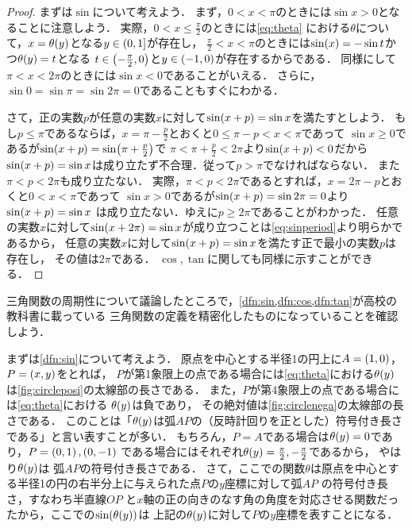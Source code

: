 \documentclass[11pt,a4paper]{ltjsarticle}
\newcommand*{\coord}[1]{\paren{#1}}
\theoremstyle{definition}
\begin{document}
\begin{proof}
  まずは$\sin$について考えよう．
  まず，$0 < x < \pi$のときには$\sin x > 0$となることに注意しよう．
  実際，$0 < x \leq \frac{\pi}{2}$のときには\cref{eq:theta}
  における$\theta$について，$x = \apply{\theta}{y}$となる$y \in \interval{lop}{0,1}$が存在し，
  $\frac{\pi}{2} < x < \pi$のときには$\apply{\sin}{x} = - \sin t$かつ$\apply{\theta}{y} = t$となる
  $t \in \interval{op}{- \frac{\pi}{2}, 0}$と$y \in \interval{op}{-1, 0}$が存在するからである．
  同様にして$\pi < x < 2 \pi$のときには$\sin x < 0$であることがいえる．
  さらに，$\sin 0 = \sin \pi = \sin 2 \pi = 0$であることもすぐにわかる．

  さて，正の実数$p$が任意の実数$x$に対して$\apply{\sin}{x + p} = \sin x$を満たすとしよう．
  もし$p \leq \pi$であるならば，$x = \pi - \frac{p}{2}$とおくと$0 \leq \pi - p < x < \pi$であって
  $\sin x \geq 0$であるが$\apply{\sin}{x + p} = \apply{\sin}{\pi + \frac{p}{2}}$で
  $\pi < \pi + \frac{p}{2} < 2 \pi$より$\apply{\sin}{x + p} < 0$だから
  $\apply{\sin}{x + p} = \sin x$は成り立たず不合理．従って$p > \pi$でなければならない．
  また$\pi < p < 2 \pi$も成り立たない．
  実際，$\pi < p < 2 \pi$であるとすれば，$x = 2 \pi - p$とおくと$0 < x < \pi$であって
  $\sin x > 0$であるが$\apply{\sin}{x + p} = \sin 2 \pi = 0$より$\apply{\sin}{x + p} = \sin x$
  は成り立たない．ゆえに$p \geq 2 \pi$であることがわかった．
  任意の実数$x$に対して$\apply{\sin}{x + 2 \pi} = \sin x$が成り立つことは\cref{eq:sinperiod}より明らかであるから，
  任意の実数$x$に対して$\apply{\sin}{x + p} = \sin x$を満たす正で最小の実数$p$は存在し，
  その値は$2 \pi$である．
  $\cos, \tan$に関しても同様に示すことができる．
\end{proof}

三角関数の周期性について議論したところで，\cref{dfn:sin,dfn:cos,dfn:tan}が高校の教科書に載っている
三角関数の定義を精密化したものになっていることを確認しよう．

まずは\cref{dfn:sin}について考えよう．
原点を中心とする半径1の円上に$A = \coord{1,0}$，$P = \coord{x,y}$をとれば，
$P$が第1象限上の点である場合には\cref{eq:theta}における$\apply{\theta}{y}$
は\cref{fig:circleposi}の太線部の長さである．
また，$P$が第4象限上の点である場合には\cref{eq:theta}における
$\apply{\theta}{y}$は負であり，
その絶対値は\cref{fig:circlenega}の太線部の長さである．
このことは「$\apply{\theta}{y}$は弧$AP$の（反時計回りを正とした）符号付き長さである」と言い表すことが多い．
もちろん，$P = A$である場合は$\apply{\theta}{y} = 0$であり，$P = \coord{0, 1}, \coord{0, -1}$
である場合にはそれぞれ$\apply{\theta}{y} = \frac{\pi}{2}, - \frac{\pi}{2}$であるから，
やはり$\apply{\theta}{y}$は
弧$AP$の符号付き長さである．
さて，ここでの関数$\theta$は原点を中心とする半径1の円の右半分上に与えられた点$P$の$y$座標に対して弧$AP$
の符号付き長さ，すなわち半直線$OP$
と$x$軸の正の向きのなす角の角度を対応させる関数だったから，ここでの$\apply{\sin}{\apply{\theta}{y}}$は
上記の$\apply{\theta}{y}$に対して$P$の$y$座標を表すことになる．
\end{document}
